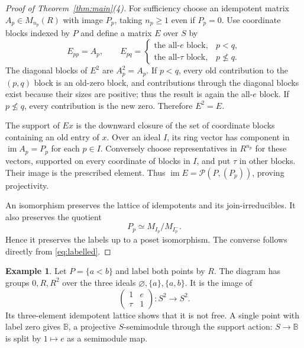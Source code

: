\documentclass[11pt]{amsart}
\newcommand{\B}{\mathbb B}
\DeclareMathOperator{\im}{im}
\theoremstyle{definition}
\newtheorem{example}[theorem]{Example}
\theoremstyle{remark}
\begin{document}
\begin{proof}[Proof of Theorem~\ref{thm:main}(4)]
For sufficiency choose an idempotent matrix $A_p\in M_{n_p}(R)$ with image $P_p$, taking $n_p\ge1$ even if $P_p=0$. Use coordinate blocks indexed by $P$ and define a matrix $E$ over $S$ by
\[
 E_{pp}=A_p,\qquad
 E_{pq}=\begin{cases}\text{the all-}e\text{ block},&p<q,\\
                         \text{the all-}\tau\text{ block},&p\not\le q.
          \end{cases}
\]
The diagonal blocks of $E^2$ are $A_p^2=A_p$. If $p<q$, every old contribution to the $(p,q)$ block is an old-zero block, and contributions through the diagonal blocks exist because their sizes are positive; thus the result is again the all-$e$ block. If $p\not\le q$, every contribution is the new zero. Therefore $E^2=E$.

The support of $Ex$ is the downward closure of the set of coordinate blocks containing an old entry of $x$. Over an ideal $I$, its ring vector has component in $\im A_p=P_p$ for each $p\in I$. Conversely choose representatives in $R^{n_p}$ for these vectors, supported on every coordinate of blocks in $I$, and put $\tau$ in other blocks. Their image is the prescribed element. Thus $\im E=\mathcal P(P,(P_p))$, proving projectivity.

An isomorphism preserves the lattice of idempotents and its join-irreducibles. It also preserves the quotient
\[
 P_p\simeq M_{I_p}/M_{I_p^-}.
\]
Hence it preserves the labels up to a poset isomorphism. The converse follows directly from \eqref{eq:labelled}.
\end{proof}

\begin{example}
Let $P=\{a<b\}$ and label both points by $R$. The diagram has groups $0,R,R^2$ over the three ideals $\varnothing,\{a\},\{a,b\}$. It is the image of
\[
 \begin{pmatrix}1&e\\ \tau&1\end{pmatrix}:S^2\longrightarrow S^2.
\]
Its three-element idempotent lattice shows that it is not free. A single point with label zero gives $\B$, a projective $S$-semimodule through the support action: $S\to\B$ is split by $1\mapsto e$ as a semimodule map.
\end{example}
\end{document}
